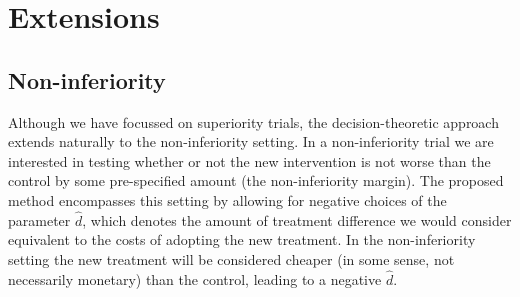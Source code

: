 \documentclass[sagev, Crown]{sagej} %
\begin{document}




\section{Extensions}\label{sec:extensions}

\subsection{Non-inferiority}

Although we have focussed on superiority trials, the decision-theoretic approach extends naturally to the non-inferiority setting. In a non-inferiority trial we are interested in testing whether or not the new intervention is not worse than the control by some pre-specified amount (the non-inferiority margin). The proposed method encompasses this setting by allowing for negative choices of the parameter $\hat{d}$, which denotes the amount of treatment difference we would consider equivalent to the costs of adopting the new treatment. In the non-inferiority setting the new treatment will be considered cheaper (in some sense, not necessarily monetary) than the control, leading to a negative $\hat{d}$.
\end{document}
